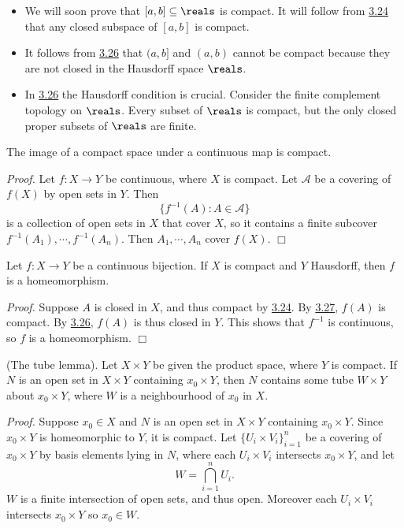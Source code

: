 \begin{itemize}
    \item We will soon prove that $[a, b] \subseteq \reals$ is compact. It will follow from \hyperref[3.24]{3.24} that any closed subspace of $[a, b]$ is compact.

    \item It follows from \hyperref[3.26]{3.26} that $(a, b]$ and $(a, b)$ cannot be compact because they are not closed in the Hausdorff space $\reals$.

    \item In \hyperref[3.26]{3.26} the Hausdorff condition is crucial. Consider the finite complement topology on $\reals$. Every subset of $\reals$ is compact, but the only closed proper subsets of $\reals$ are finite.
\end{itemize}

\begin{theorem}\label{3.27}
    The image of a compact space under a continuous map is compact.
\end{theorem}
{\it Proof.} Let $f: X \rightarrow Y$ be continuous, where $X$ is compact. Let $\mathcal{A}$ be a covering of $f(X)$ by open sets in $Y$. Then
$$\{f^{-1}(A): A \in \mathcal{A}\}$$
is a collection of open sets in $X$ that cover $X$, so it contains a finite subcover $f^{-1}(A_1), \cdots, f^{-1}(A_n)$. Then $A_1, \cdots, A_n$ cover $f(X)$. $\Box$

\begin{theorem}\label{3.28}
    Let $f: X \rightarrow Y$ be a continuous bijection. If $X$ is compact and $Y$ Hausdorff, then $f$ is a homeomorphism.
\end{theorem}
{\it Proof.} Suppose $A$ is closed in $X$, and thus compact by \hyperref[3.24]{3.24}. By \hyperref[3.27]{3.27}, $f(A)$ is compact. By \hyperref[3.26]{3.26}, $f(A)$ is thus closed in $Y$. This shows that $f^{-1}$ is continuous, so $f$ is a homeomorphism. $\Box$

\begin{lemma}\label{3.29}
    (The tube lemma). Let $X \times Y$ be given the product space, where $Y$ is compact. If $N$ is an open set in $X \times Y$ containing $x_0 \times Y$, then $N$ contains some tube $W \times Y$ about $x_0 \times Y$, where $W$ is a neighbourhood of $x_0$ in $X.$
\end{lemma}
{\it Proof.} Suppose $x_0 \in X$ and $N$ is an open set in $X \times Y$ containing $x_0 \times Y$. Since $x_0 \times Y$ is homeomorphic to $Y$, it is compact. Let $\{U_i \times V_i\}_{i=1}^n$ be a covering of $x_0 \times Y$ by basis elements lying in $N$, where each $U_i \times V_i$ intersects $x_0 \times Y$, and let
$$W = \bigcap_{i=1}^n U_i.$$
$W$ is a finite intersection of open sets, and thus open. Moreover each $U_i \times V_i$ intersects $x_0 \times Y$ so $x_0 \in W$.

